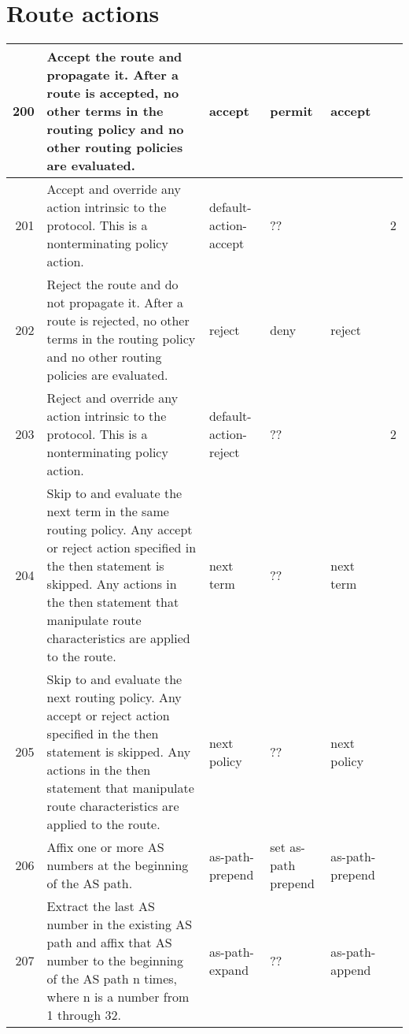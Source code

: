 \documentclass[letterpaper]{article}
\begin{document}
\section{Route actions}
\begin{center}
\tabletail{
\hline
}
\begin{supertabular}{|r |p{6cm} |p{2cm} |p{2cm} |p{2cm} |r|}
\hline

200 &
Accept the route and propagate it. After a route is accepted, no other
terms in the routing policy and no other routing policies are evaluated.
& accept & permit &  accept &\\
\hline

201 &
Accept and override any action intrinsic to the protocol. This is a
nonterminating policy action.
& default-action-accept & ?? &  & 2 \\
\hline

202 &
Reject the route and do not propagate it. After a route is rejected, no
other terms in the routing policy and no other routing policies are
evaluated.
& reject & deny & reject &\\
\hline

203 &
Reject and override any action intrinsic to the protocol. This is a
nonterminating policy action.
& default-action-reject & ?? &  & 2 \\
\hline

204 &
Skip to and evaluate the next term in the same routing policy. Any accept or
reject action specified in the then statement is skipped. Any actions in the
then statement that manipulate route characteristics are applied to the route.
& next term & ?? & next term &   \\
\hline

205 &
Skip to and evaluate the next routing policy. Any accept or reject action
specified in the then statement is skipped. Any actions in the then statement
that manipulate route characteristics are applied to the route.
& next policy & ?? & next policy &   \\
\hline

206 &
Affix one or more AS numbers at the beginning of the AS path.
& as-path-prepend & set as-path prepend & as-path-prepend &\\
\hline

207 &
Extract the last AS number in the existing AS path and affix that AS number to
the beginning of the AS path n times, where n is a number from 1 through 32. 
& as-path-expand & ?? & as-path-append &\\
\hline


\end{supertabular}
\end{center}
\end{document}
